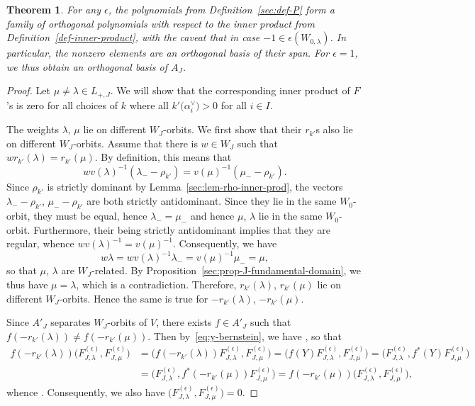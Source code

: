 \documentclass[pdftex]{sigma}
\newtheorem{Theorem}{Theorem}[section]
\theoremstyle{definition}
\numberwithin{equation}{section}
\begin{document}
\begin{Theorem}\label{sec:thm-ortho}
 For any $\epsilon$, the polynomials  from Definition~{\rm\ref{sec:def-P}} form a family of
 orthogonal polynomials with respect to the inner product from Definition~{\rm\ref{def-inner-product}}, with the caveat that  in
 case $-1\in\epsilon(W_{0,\lambda})$.
 In particular, the nonzero elements are an orthogonal basis of their
 span. For $\epsilon=1$, we thus obtain an orthogonal basis of $A_J$.
\end{Theorem}
\begin{proof}
 Let $\mu\ne \lambda\in L_{+,J}$. We will show that the corresponding inner product of $F$'s is zero for
 all choices of $k$ where all $k'\bigl(\alpha_i^\vee\bigr)>0$ for all $i\in I$.

 The weights $\lambda$, $\mu$ lie on different $W_J$-orbits. We first show that their $r_{k'}$s also lie on different $W_J$-orbits.
 Assume that there is $w\in W_J$ such that
 $wr_{k'}(\lambda)=r_{k'}(\mu)$. By definition, this means that
 \[
 wv(\lambda)^{-1}(\lambda_- - \rho_{k'})
 = v(\mu)^{-1}(\mu_- - \rho_{k'}).
 \]
 Since $\rho_{k'}$ is strictly dominant by Lemma~\ref{sec:lem-rho-inner-prod}, the vectors $\lambda_--\rho_{k'}$, $\mu_--\rho_{k'}$ are both
 strictly antidominant. Since they lie in the same $W_0$-orbit, they must be equal, hence
 $\lambda_-=\mu_-$ and hence $\mu$, $\lambda$ lie in the same $W_0$-orbit.
 Furthermore, their being strictly antidominant implies that they are
 regular, whence $wv(\lambda)^{-1} = v(\mu)^{-1}$. Consequently, we have
 \[
 w\lambda = wv(\lambda)^{-1}\lambda_-
 = v(\mu)^{-1}\mu_- = \mu,
 \]
 so that $\mu$, $\lambda$ are $W_J$-related. By Proposition~\ref{sec:prop-J-fundamental-domain}, we thus have $\mu=\lambda$, which is a contradiction.
 Therefore, $r_{k'}(\lambda)$, $r_{k'}(\mu)$ lie on different $W_J$-orbits.
 Hence the same is true for $-r_{k'}(\lambda)$, $-r_{k'}(\mu)$.

 Since $A'_J$ separates $W_J$-orbits of $V$, there exists $f\in A'_J$ such that $f(-r_{k'}(\lambda))\ne f(-r_{k'}(\mu))$. Then
 by~\eqref{eq:y-bernstein}, we have ,
 so that
 \begin{align*}
 f(-r_{k'}(\lambda)) \bigl(F^{(\epsilon)}_{J,\lambda}, F^{(\epsilon)}_{J,\mu}\bigr) &=
 \bigl(f(-r_{k'}(\lambda)) F^{(\epsilon)}_{J,\lambda}, F^{(\epsilon)}_{J,\mu}\bigr)= \bigl(f(Y)F^{(\epsilon)}_{J,\lambda}, F^{(\epsilon)}_{J,\mu}\bigr)= \bigl(F^{(\epsilon)}_{J,\lambda}, f^*(Y)F^{(\epsilon)}_{J,\mu}\bigr)\\
 &= \bigl(F^{(\epsilon)}_{J,\lambda}, f^*(-r_{k'}(\mu)) F^{(\epsilon)}_{J,\mu}\bigr)= f(-r_{k'}(\mu)) \bigl(F^{(\epsilon)}_{J,\lambda}, F^{(\epsilon)}_{J,\mu}\bigr),
 \end{align*}
 whence .
 Consequently, we also have
$
 \bigl(F^{(\epsilon)}_{J,\lambda},F^{(\epsilon)}_{J,\mu}\bigr)=0$.


\end{proof}
\end{document}
